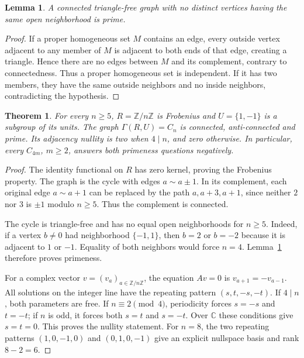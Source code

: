 \documentclass[10pt]{article}
\newtheorem{theorem}{Theorem}
\newtheorem{lemma}{Lemma}
\newcommand{\C}{\mathbb C}
\begin{document}
\begin{lemma}\label{lem:twins}
A connected triangle-free graph with no distinct vertices having the
same open neighborhood is prime.
\end{lemma}
\begin{proof}
If a proper homogeneous set $M$ contains an edge, every outside vertex
adjacent to any member of $M$ is adjacent to both ends of that edge,
creating a triangle. Hence there are no edges between $M$ and its
complement, contrary to connectedness. Thus a proper homogeneous set
is independent. If it has two members, they have the same outside
neighbors and no inside neighbors, contradicting the hypothesis.
\end{proof}

\begin{theorem}\label{thm:cycles}
For every $n\geq5$, $R=\mathbb Z/n\mathbb Z$ is Frobenius and
$U=\{1,-1\}$ is a subgroup of its units. The graph $\Gamma(R,U)=C_n$
is connected, anti-connected and prime. Its adjacency nullity is two
when $4\mid n$, and zero otherwise. In particular, every $C_{4m}$,
$m\geq2$, answers both primeness questions negatively.
\end{theorem}
\begin{proof}
The identity functional on $R$ has zero kernel, proving the Frobenius
property. The graph is the cycle with edges $a\sim a\pm1$.
In its complement, each original edge $a\sim a+1$ can be replaced by
the path $a,a+3,a+1$, since neither $2$ nor $3$ is $\pm1$ modulo
$n\geq5$. Thus the complement is connected.

The cycle is triangle-free and has no equal open neighborhoods for
$n\geq5$. Indeed, if a vertex $b\neq0$ had neighborhood
$\{-1,1\}$, then $b=2$ or $b=-2$ because it is adjacent to $1$ or
$-1$. Equality of both neighbors would force $n=4$.
Lemma~\ref{lem:twins} therefore proves primeness.

For a complex vector $v=(v_a)_{a\in\mathbb Z/n\mathbb Z}$, the
equation $Av=0$ is $v_{a+1}=-v_{a-1}$. All solutions on the integer
line have the repeating pattern $(s,t,-s,-t)$.
If $4\mid n$, both parameters are free. If $n\equiv2\pmod4$,
periodicity forces $s=-s$ and $t=-t$; if $n$ is odd, it forces both
$s=t$ and $s=-t$. Over $\C$ these conditions give $s=t=0$.
This proves the nullity statement. For $n=8$, the two repeating
patterns $(1,0,-1,0)$ and $(0,1,0,-1)$ give an explicit nullspace
basis and rank $8-2=6$.
\end{proof}
\end{document}
